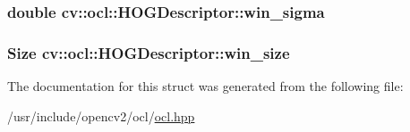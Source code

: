 \hypertarget{structcv_1_1ocl_1_1HOGDescriptor_ab022766fbe3ac26172e15cefaa4c5a25}{
\subsubsection[{win\-\_\-sigma}]{\setlength{\rightskip}{0pt plus 5cm}double cv\-::ocl\-::\-H\-O\-G\-Descriptor\-::win\-\_\-sigma}}\label{structcv_1_1ocl_1_1HOGDescriptor_ab022766fbe3ac26172e15cefaa4c5a25}
\hypertarget{structcv_1_1ocl_1_1HOGDescriptor_a64a0fb7b26799b3b7b62ecc3db2c5601}{
\subsubsection[{win\-\_\-size}]{\setlength{\rightskip}{0pt plus 5cm}Size cv\-::ocl\-::\-H\-O\-G\-Descriptor\-::win\-\_\-size}}\label{structcv_1_1ocl_1_1HOGDescriptor_a64a0fb7b26799b3b7b62ecc3db2c5601}


The documentation for this struct was generated from the following file\-:\begin{DoxyCompactItemize}
\item 
/usr/include/opencv2/ocl/\hyperlink{ocl_2ocl_8hpp}{ocl.\-hpp}\end{DoxyCompactItemize}
